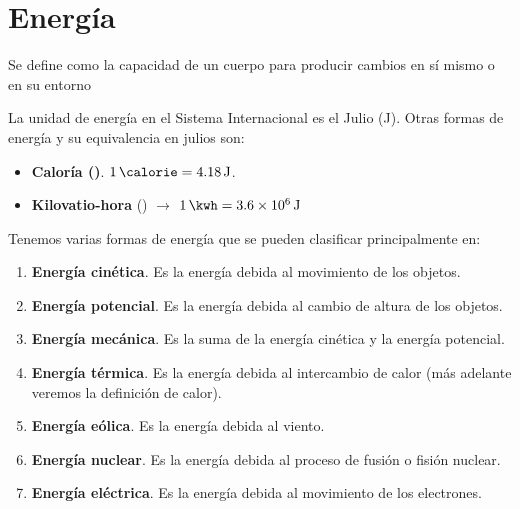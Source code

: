 


\section{Energía}
\begin{definition}[Energía]
    Se define como la capacidad de un cuerpo para producir cambios en sí mismo o en su entorno
\end{definition}
La unidad de energía en el Sistema Internacional es el Julio (\unit{\joule}). Otras formas de energía y su equivalencia en julios son:
\begin{itemize}
    \item \textbf{Caloría (\unit{\calorie})}. \( \qty{1}{\calorie} = \qty{4.18}{\joule} \).
    \item \textbf{Kilovatio-hora} (\unit{\kwh}) \( \longrightarrow \) \( \qty{1}{\kwh} = \qty{3.6e6}{\joule} \)
\end{itemize}
Tenemos varias formas de energía que se pueden clasificar principalmente en:
\begin{enumerate}[label=\letraminuscula]
        \item \textbf{Energía cinética}.
        Es la energía debida al movimiento de los objetos.
        \item \textbf{Energía potencial}.
        Es la energía debida al cambio de altura de los objetos.
        \item \textbf{Energía mecánica}.
        Es la suma de la energía cinética y la energía potencial.
        \item \textbf{Energía térmica}.
        Es la energía debida al intercambio de calor (más adelante veremos la definición de calor).
        \item \textbf{Energía eólica}.
        Es la energía debida al viento.
        \item \textbf{Energía nuclear}.
        Es la energía debida al proceso de fusión o fisión nuclear.
        \item \textbf{Energía eléctrica}.
        Es la energía debida al movimiento de los electrones.
\end{enumerate}


